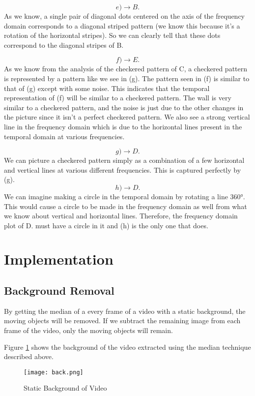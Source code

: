 \documentclass[12pt, letterpaper]{article}
\begin{document}
\[ e) \xrightarrow{} B. \]
As we know, a single pair of diagonal dots centered on the axis of the frequency domain corresponds to a diagonal striped pattern (we know this because it's a rotation of the horizontal stripes). So we can clearly tell that these dots correspond to the diagonal stripes of B.

\[ f) \xrightarrow{} E. \]
As we know from the analysis of the checkered pattern of C, a checkered pattern is represented by a pattern like we see in (g). The pattern seen in (f) is similar to that of (g) except with some noise. This indicates that the temporal representation of (f) will be similar to a checkered pattern. The wall is very similar to a checkered pattern, and the noise is just due to the other changes in the picture since it isn't a perfect checkered pattern. We also see a strong vertical line in the frequency domain which is due to the horizontal lines present in the temporal domain at various frequencies.

\[ g) \xrightarrow{} D. \]
We can picture a checkered pattern simply as a combination of a few horizontal and vertical lines at various different frequencies. This is captured perfectly by (g). 
\[ h) \xrightarrow{} D. \]
We can imagine making a circle in the temporal domain by rotating a line \ang{360}. This would cause a circle to be made in the frequency domain as well from what we know about vertical and horizontal lines. Therefore, the frequency domain plot of D. must have a circle in it and (h) is the only one that does.


\section{Implementation}

\subsection{Background Removal}

By getting the median of a every frame of a video with a static background, the moving objects will be removed. If we subtract the remaining image from each frame of the video, only the moving objects will remain.


Figure \ref{fig:background} shows the background of the video extracted using the median technique described above.


\begin{figure}[H]
    \centering
    \texttt{[image: back.png]}
    \caption{Static Background of Video}
    \label{fig:background}
\end{figure}
\end{document}
